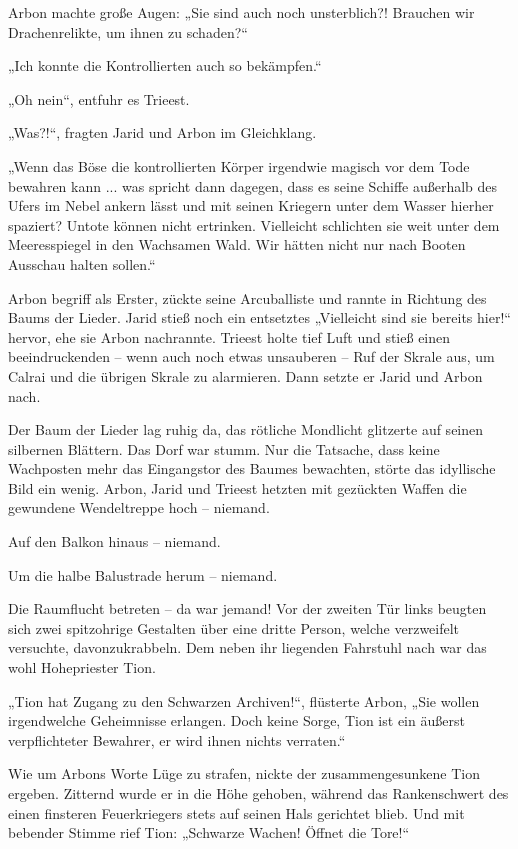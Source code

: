 Arbon machte große Augen: „Sie sind auch noch unsterblich?! Brauchen wir Drachenrelikte, um ihnen zu schaden?“

„Ich konnte die Kontrollierten auch so bekämpfen.“

„Oh nein“, entfuhr es Trieest.

„Was?!“, fragten Jarid und Arbon im Gleichklang.

„Wenn das Böse die kontrollierten Körper irgendwie magisch vor dem Tode bewahren kann ... was spricht dann dagegen, dass es seine Schiffe außerhalb des Ufers im Nebel ankern lässt und mit seinen Kriegern unter dem Wasser hierher spaziert? Untote können nicht ertrinken. Vielleicht schlichten sie weit unter dem Meeresspiegel in den Wachsamen Wald. Wir hätten nicht nur nach Booten Ausschau halten sollen.“

Arbon begriff als Erster, zückte seine Arcuballiste und rannte in Richtung des Baums der Lieder. Jarid stieß noch ein entsetztes „Vielleicht sind sie bereits hier!“ hervor, ehe sie Arbon nachrannte. Trieest holte tief Luft und stieß einen beeindruckenden – wenn auch noch etwas unsauberen – Ruf der Skrale aus, um Calrai und die übrigen Skrale zu alarmieren. Dann setzte er Jarid und Arbon nach.\bigskip







Der Baum der Lieder lag ruhig da, das rötliche Mondlicht glitzerte auf seinen silbernen Blättern. Das Dorf war stumm. Nur die Tatsache, dass keine Wachposten mehr das Eingangstor des Baumes bewachten, störte das idyllische Bild ein wenig. Arbon, Jarid und Trieest hetzten mit gezückten Waffen die gewundene Wendeltreppe hoch – niemand.

Auf den Balkon hinaus – niemand.

Um die halbe Balustrade herum – niemand.

Die Raumflucht betreten – da war jemand! Vor der zweiten Tür links beugten sich zwei spitzohrige Gestalten über eine dritte Person, welche verzweifelt versuchte, davonzukrabbeln. Dem neben ihr liegenden Fahrstuhl nach war das wohl Hohepriester Tion.

„Tion hat Zugang zu den Schwarzen Archiven!“, flüsterte Arbon, „Sie wollen irgendwelche Geheimnisse erlangen. Doch keine Sorge, Tion ist ein äußerst verpflichteter Bewahrer, er wird ihnen nichts verraten.“

Wie um Arbons Worte Lüge zu strafen, nickte der zusammengesunkene Tion ergeben. Zitternd wurde er in die Höhe gehoben, während das Rankenschwert des einen finsteren Feuerkriegers stets auf seinen Hals gerichtet blieb. Und mit bebender Stimme rief Tion: „Schwarze Wachen! Öffnet die Tore!“


